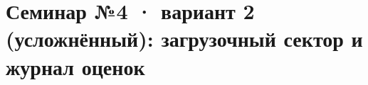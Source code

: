 

\section*{Семинар №4 · вариант 2 (усложнённый): загрузочный сектор и журнал оценок}
\tableofcontents


